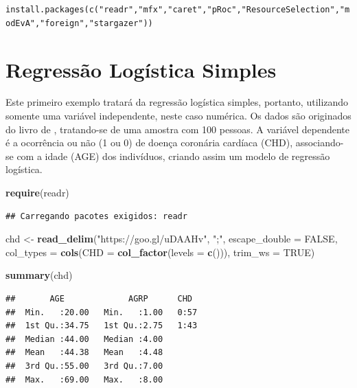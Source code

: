 \documentclass[12pt,brazil,]{book}
\newenvironment{Shaded}{\begin{snugshade}}{\end{snugshade}}
\newcommand{\DataTypeTok}[1]{\textcolor[rgb]{0.13,0.29,0.53}{#1}}
\newcommand{\KeywordTok}[1]{\textcolor[rgb]{0.13,0.29,0.53}{\textbf{#1}}}
\newcommand{\NormalTok}[1]{#1}
\newcommand{\OtherTok}[1]{\textcolor[rgb]{0.56,0.35,0.01}{#1}}
\newcommand{\StringTok}[1]{\textcolor[rgb]{0.31,0.60,0.02}{#1}}
\begin{document}
\texttt{install.packages(c("readr","mfx","caret","pRoc","ResourceSelection","modEvA","foreign","stargazer"))}

\hypertarget{regressao-logistica-simples}{%
\section{Regressão Logística
Simples}\label{regressao-logistica-simples}}

Este primeiro exemplo tratará da regressão logística simples, portanto,
utilizando somente uma variável independente, neste caso numérica. Os
dados são originados do livro de \textcite{Hosmer2000}, tratando-se de
uma amostra com 100 pessoas. A variável dependente é a ocorrência ou não
(1 ou 0) de doença coronária cardíaca (CHD), associando-se com a idade
(AGE) dos indivíduos, criando assim um modelo de regressão logística.

\begin{Shaded}
\begin{Highlighting}[]
\KeywordTok{require}\NormalTok{(readr)}
\end{Highlighting}
\end{Shaded}

\begin{verbatim}
## Carregando pacotes exigidos: readr
\end{verbatim}

\begin{Shaded}
\begin{Highlighting}[]
\NormalTok{chd <-}\StringTok{ }\KeywordTok{read_delim}\NormalTok{(}\StringTok{"https://goo.gl/uDAAHv"}\NormalTok{, }
    \StringTok{";"}\NormalTok{, }\DataTypeTok{escape_double =} \OtherTok{FALSE}\NormalTok{, }\DataTypeTok{col_types =} \KeywordTok{cols}\NormalTok{(}\DataTypeTok{CHD =} \KeywordTok{col_factor}\NormalTok{(}\DataTypeTok{levels =} \KeywordTok{c}\NormalTok{())), }
    \DataTypeTok{trim_ws =} \OtherTok{TRUE}\NormalTok{)}

\KeywordTok{summary}\NormalTok{(chd)}
\end{Highlighting}
\end{Shaded}

\begin{verbatim}
##       AGE             AGRP      CHD   
##  Min.   :20.00   Min.   :1.00   0:57  
##  1st Qu.:34.75   1st Qu.:2.75   1:43  
##  Median :44.00   Median :4.00         
##  Mean   :44.38   Mean   :4.48         
##  3rd Qu.:55.00   3rd Qu.:7.00         
##  Max.   :69.00   Max.   :8.00
\end{verbatim}
\end{document}
